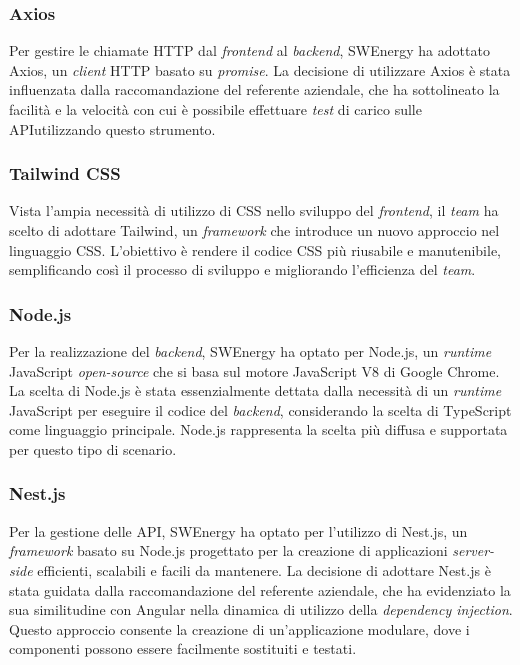\subsubsection{Axios}
Per gestire le chiamate HTTP dal \textit{frontend} al \textit{backend}, SWEnergy
ha adottato Axios, un \textit{client} HTTP basato su \textit{promise}. La decisione di utilizzare
Axios è stata influenzata dalla raccomandazione del referente aziendale, che ha
sottolineato la facilità e la velocità con cui è possibile effettuare \textit{test} di
carico sulle API\g utilizzando questo strumento.


\subsubsection{Tailwind CSS}
Vista l'ampia necessità di utilizzo di CSS nello sviluppo del \textit{frontend},
il \textit{team} ha scelto di adottare Tailwind, un \textit{framework} che introduce un
nuovo approccio nel linguaggio CSS. L'obiettivo è rendere il codice CSS più
riusabile e manutenibile, semplificando così il processo di sviluppo e
migliorando l'efficienza del \textit{team}.


\subsubsection{Node.js}
Per la realizzazione del \textit{backend}, SWEnergy ha optato per Node.js, un
\textit{runtime} JavaScript \textit{open-source} che si basa sul motore JavaScript V8 di
Google Chrome. La scelta di Node.js è stata essenzialmente dettata dalla
necessità di un \textit{runtime} JavaScript per eseguire il codice del
\textit{backend}, considerando la scelta di TypeScript come linguaggio
principale. Node.js rappresenta la scelta più diffusa e supportata per questo
tipo di scenario.


\subsubsection{Nest.js}
Per la gestione delle API\g, SWEnergy ha optato per l'utilizzo di Nest.js, un
\textit{framework} basato su Node.js progettato per la creazione di applicazioni
\textit{server-side} efficienti, scalabili e facili da mantenere. La decisione di
adottare Nest.js è stata guidata dalla raccomandazione del referente aziendale, che ha
evidenziato la sua similitudine con Angular nella dinamica di utilizzo della
\textit{dependency injection}. Questo approccio consente la creazione di
un'applicazione modulare, dove i componenti possono essere facilmente sostituiti
e testati.


